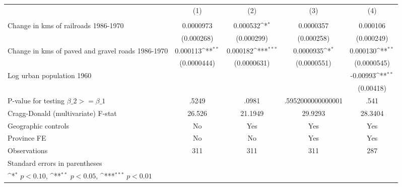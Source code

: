 {
\def\sym#1{\ifmmode^{#1}\else\(^{#1}\)\fi}
\begin{tabular}{l*{4}{c}}
\hline\hline
                &\multicolumn{1}{c}{(1)}&\multicolumn{1}{c}{(2)}&\multicolumn{1}{c}{(3)}&\multicolumn{1}{c}{(4)}\\
                &\multicolumn{1}{c}{}&\multicolumn{1}{c}{}&\multicolumn{1}{c}{}&\multicolumn{1}{c}{}\\
\hline
Change in kms of railroads 1986-1970&0.0000973         & 0.000532\sym{*}  &0.0000357         & 0.000106         \\
                &(0.000268)         &(0.000299)         &(0.000258)         &(0.000249)         \\
[1em]
Change in kms of paved and gravel roads 1986-1970& 0.000113\sym{**} & 0.000182\sym{***}&0.0000935\sym{*}  & 0.000130\sym{**} \\
                &(0.0000444)         &(0.0000631)         &(0.0000551)         &(0.0000545)         \\
[1em]
Log urban population 1960&                  &                  &                  & -0.00993\sym{**} \\
                &                  &                  &                  &(0.00418)         \\
\hline
P-value for testing $\beta\_{2} >= \beta\_{1}$&    .5249         &    .0981         &.5952000000000001         &     .541         \\
Cragg-Donald (multivariate) F-stat&   26.526         &  21.1949         &  29.9293         &  28.3404         \\
Geographic controls&       No         &      Yes         &      Yes         &      Yes         \\
Province FE     &       No         &       No         &      Yes         &      Yes         \\
Observations    &      311         &      311         &      311         &      287         \\
\hline\hline
\multicolumn{5}{l}{\footnotesize Standard errors in parentheses}\\
\multicolumn{5}{l}{\footnotesize \sym{*} \(p<0.10\), \sym{**} \(p<0.05\), \sym{***} \(p<0.01\)}\\
\end{tabular}
}
